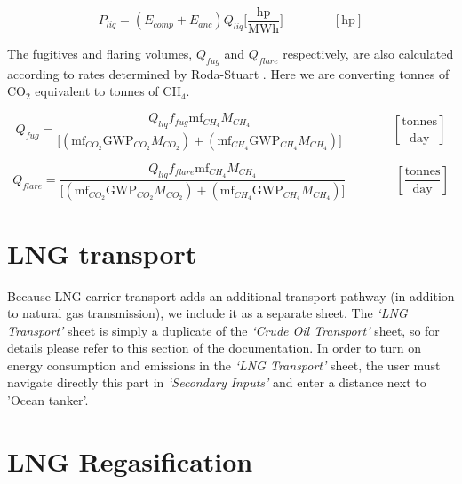 \documentclass[11pt]{report}
\newcommand{\sheet}[1]{\textit{`{#1}'}}
\newcommand{\eqnunit}[1]{\quad\quad \scriptstyle{\left[\text{#1}\right]}}
\newcommand{\eqnunitfrac}[2]{\quad\quad \scriptstyle{\left[\frac{\text{#1}}{\text{#2}}\right]}}
\begin{document}
\begin{equation}
P_{liq} = \left(E_{comp} + E_{anc}\right) Q_{liq} \Big[\frac{\textrm{hp}}{\textrm{MWh}} \Big] \quad\quad\eqnunit{hp}
\end{equation}

The fugitives and flaring volumes, $Q_{fug}$ and $Q_{flare}$ respectively, are also calculated according to rates determined by Roda-Stuart \cite{RodaStuart2018}. Here we are converting tonnes of CO$_2$ equivalent to tonnes of CH$_4$.

\begin{equation}
Q_{fug} = \frac{Q_{liq} f_{fug} \textrm{mf}_{CH_4} M_{CH_4}}{\Big[\left(\textrm{mf}_{CO_2} \textrm{GWP}_{CO_2} M_{CO_2}\right) + \left(\textrm{mf}_{CH_4} \textrm{GWP}_{CH_4} M_{CH_4}\right)\Big]} \quad\quad\eqnunitfrac{tonnes}{day}
\end{equation}

\begin{equation}
Q_{flare} = \frac{Q_{liq} f_{flare} \textrm{mf}_{CH_4} M_{CH_4}}{\Big[\left(\textrm{mf}_{CO_2} \textrm{GWP}_{CO_2} M_{CO_2}\right) + \left(\textrm{mf}_{CH_4} \textrm{GWP}_{CH_4} M_{CH_4}\right)\Big]} \quad\quad\eqnunitfrac{tonnes}{day}
\end{equation}

\clearpage

\section{LNG transport}
\label{sec:lng_transport}

Because LNG carrier transport adds an additional transport pathway (in addition to natural gas transmission), we include it as a separate sheet. The \sheet{LNG Transport} sheet is simply a duplicate of the \sheet{Crude Oil Transport} sheet, so for details please refer to this section of the documentation.
In order to turn on energy consumption and emissions in the \sheet{LNG Transport} sheet, the user must navigate directly this part in \sheet{Secondary Inputs} and enter a distance next to 'Ocean tanker'.

\clearpage

\section{LNG Regasification}
\label{sec:lng_regassification}
\end{document}
